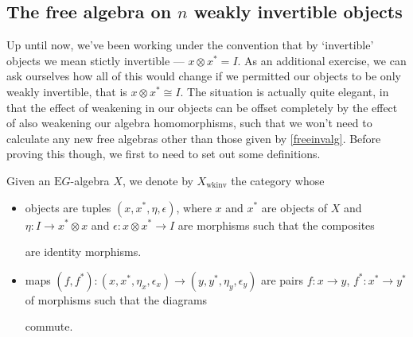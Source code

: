 \subsection{The free algebra on $n$ weakly invertible objects}

Up until now, we've been working under the convention that by `invertible' objects we mean stictly invertible --- $x \otimes x^* = I$. As an additional exercise, we can ask ourselves how all of this would change if we permitted our objects to be only weakly invertible, that is $x \otimes x^* \cong I$. The situation is actually quite elegant, in that the effect of weakening in our objects can be offset completely by the effect of also weakening our algebra homomorphisms, such that we won't need to calculate any new free algebras other than those given by \cref{freeinvalg}. Before proving this though, we first to need to set out some definitions.

\begin{defn} Given an $\mathrm{E}G$-algebra $X$, we denote by $X_{\mathrm{wkinv}}$ the category whose
\begin{itemize}
\item objects are tuples $(x, x^*, \eta, \epsilon)$, where $x$ and $x^*$ are objects of $X$ and $\eta: I \to x^* \otimes x$ and $\epsilon : x \otimes x^* \to I$ are morphisms such that the composites
\begin{eq*}  \end{eq*}
are identity morphisms.
\item maps $(f, f^*): (x, x^*, \eta_x, \epsilon_x) \to (y, y^*, \eta_y, \epsilon_y)$ are pairs $f: x \to y$, $f^* : x^* \to y^*$ of morphisms such that the diagrams
\begin{eq*}  \end{eq*}
commute.
\end{itemize}
\end{defn}

